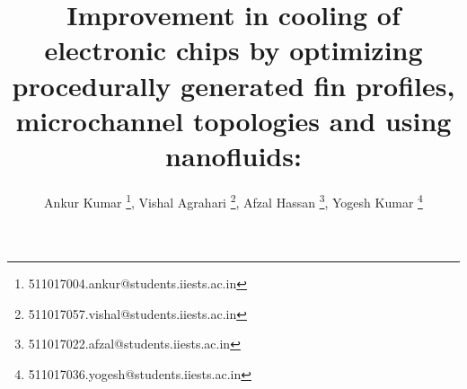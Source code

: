 \documentclass[
	fontsize=12pt, %
	twoside=false, %
	numbers=noenddot, %
]{kaohandt}
\begin{document}
\title{
	Improvement in cooling of electronic chips
	by optimizing procedurally generated fin profiles, microchannel topologies and using nanofluids: \\
}
\author[ank]{
	Ankur Kumar \footnote{511017004.ankur@students.iiests.ac.in},
	Vishal Agrahari \footnote{511017057.vishal@students.iiests.ac.in},
	Afzal Hassan \footnote{511017022.afzal@students.iiests.ac.in},
	Yogesh Kumar \footnote{511017036.yogesh@students.iiests.ac.in}
}

\maketitle







\end{document}
